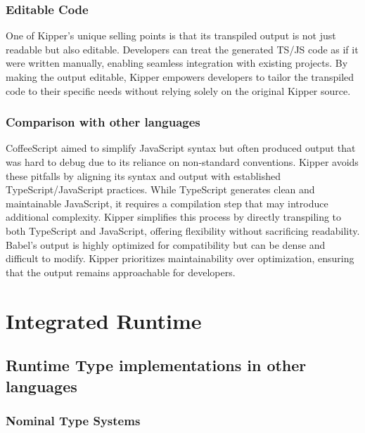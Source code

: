 \subsubsection{Editable Code}
One of Kipper's unique selling points is that its transpiled output is not just readable but also editable. Developers can treat the generated TS/JS code as if it were written manually, enabling seamless integration with existing projects. By making the output editable, Kipper empowers developers to tailor the transpiled code to their specific needs without relying solely on the original Kipper source.

\subsubsection{Comparison with other languages}
CoffeeScript aimed to simplify JavaScript syntax but often produced output that was hard to debug due to its reliance on non-standard conventions. Kipper avoids these pitfalls by aligning its syntax and output with established TypeScript/JavaScript practices. While TypeScript generates clean and maintainable JavaScript, it requires a compilation step that may introduce additional complexity. Kipper simplifies this process by directly transpiling to both TypeScript and JavaScript, offering flexibility without sacrificing readability. Babel's output is highly optimized for compatibility but can be dense and difficult to modify. Kipper prioritizes maintainability over optimization, ensuring that the output remains approachable for developers.

\section{Integrated Runtime}
\label{sec:integrated-runtime}

\subsection{Runtime Type implementations in other languages}
\label{chap:runtime-other-languages}

\subsubsection{Nominal Type Systems}

